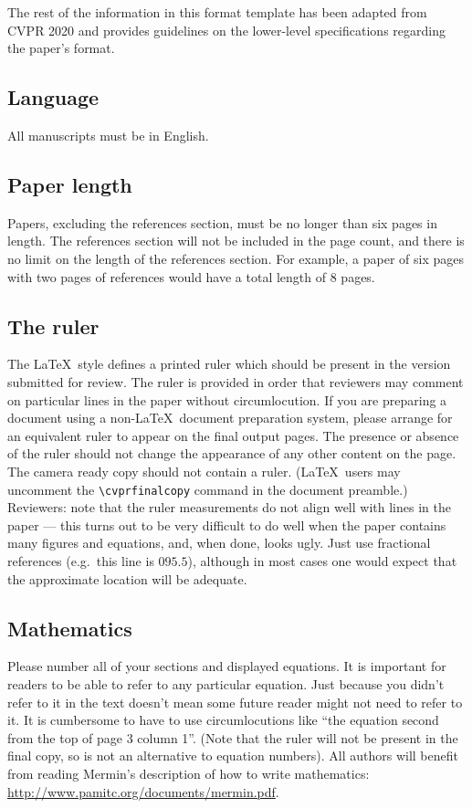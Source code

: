 \documentclass[10pt,twocolumn,letterpaper]{article}
\begin{document}
The rest of the information in this format template has been adapted from CVPR 2020 and provides guidelines on the lower-level specifications regarding the paper's format.

\subsection{Language}

All manuscripts must be in English.


\subsection{Paper length}
Papers, excluding the references section,
must be no longer than six pages in length. The references section
will not be included in the page count, and there is no limit on the
length of the references section. For example, a paper of six pages
with two pages of references would have a total length of 8 pages.

\subsection{The ruler}
The \LaTeX\ style defines a printed ruler which should be present in the
version submitted for review.  The ruler is provided in order that
reviewers may comment on particular lines in the paper without
circumlocution.  If you are preparing a document using a non-\LaTeX\
document preparation system, please arrange for an equivalent ruler to
appear on the final output pages.  The presence or absence of the ruler
should not change the appearance of any other content on the page.  The
camera ready copy should not contain a ruler. (\LaTeX\ users may uncomment
the \verb'\cvprfinalcopy' command in the document preamble.)  Reviewers:
note that the ruler measurements do not align well with lines in the paper
--- this turns out to be very difficult to do well when the paper contains
many figures and equations, and, when done, looks ugly.  Just use fractional
references (e.g.\ this line is $095.5$), although in most cases one would
expect that the approximate location will be adequate.

\subsection{Mathematics}

Please number all of your sections and displayed equations.  It is
important for readers to be able to refer to any particular equation.  Just
because you didn't refer to it in the text doesn't mean some future reader
might not need to refer to it.  It is cumbersome to have to use
circumlocutions like ``the equation second from the top of page 3 column
1''.  (Note that the ruler will not be present in the final copy, so is not
an alternative to equation numbers).  All authors will benefit from reading
Mermin's description of how to write mathematics:
\url{http://www.pamitc.org/documents/mermin.pdf}.
\end{document}
